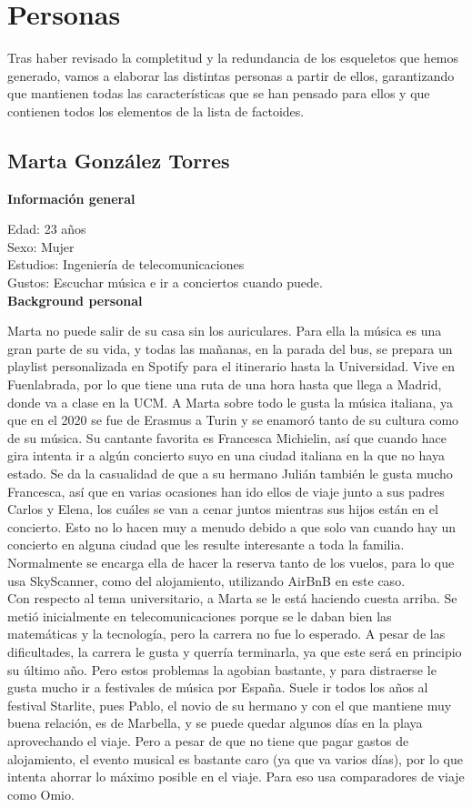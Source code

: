 \section{Personas}
Tras haber revisado la completitud y la redundancia de los esqueletos que hemos generado, vamos a elaborar las distintas personas a partir de ellos, garantizando que mantienen todas las características que se han pensado para ellos y que contienen todos los elementos de la lista de factoides.
\subsection{Marta González Torres}
\textbf{Información general}

Edad: 23 años \\
\indent Sexo: Mujer \\
\indent Estudios: Ingeniería de telecomunicaciones\\
\indent Gustos: Escuchar música e ir a conciertos cuando puede. \\

\textbf{Background personal}

Marta no puede salir de su casa sin los auriculares. Para ella la música es una gran parte de su vida, y todas las mañanas, en la parada del bus, se prepara un playlist personalizada en Spotify para el itinerario hasta la Universidad. Vive en Fuenlabrada, por lo que tiene una ruta de una hora hasta que llega a Madrid, donde va a clase en la UCM. A Marta sobre todo le gusta la música italiana, ya que en el 2020 se fue de Erasmus a Turin y se enamoró tanto de su cultura como de su música. Su cantante favorita es Francesca Michielin, así que cuando hace gira intenta ir a algún concierto suyo en una ciudad italiana en la que no haya estado.
Se da la casualidad de que a su hermano Julián también le gusta mucho Francesca, así que en varias ocasiones han ido ellos de viaje junto a sus padres Carlos y Elena, los cuáles se van a cenar juntos mientras sus hijos están en el concierto. Esto no lo hacen muy a menudo debido a que solo van cuando hay un concierto en alguna ciudad que les resulte interesante a toda la familia. Normalmente se encarga ella de hacer la reserva tanto de los vuelos, para lo que usa SkyScanner, como del alojamiento, utilizando AirBnB en este caso. \\

Con respecto al tema universitario, a Marta se le está haciendo cuesta arriba. Se metió inicialmente en telecomunicaciones porque se le daban bien las matemáticas y la tecnología, pero la carrera no fue lo esperado. A pesar de las dificultades, la carrera le gusta y querría terminarla, ya que este será en principio su último año. Pero estos problemas la agobian bastante, y para distraerse le gusta mucho ir a festivales de música por España. Suele ir todos los años al festival Starlite, pues Pablo, el novio de su hermano y con el que mantiene muy buena relación, es de Marbella, y se puede quedar algunos días en la playa aprovechando el viaje. Pero a pesar de que no tiene que pagar gastos de alojamiento, el evento musical es bastante caro (ya que va varios días), por lo que intenta ahorrar lo máximo posible en el viaje. Para eso usa comparadores de viaje como Omio.

